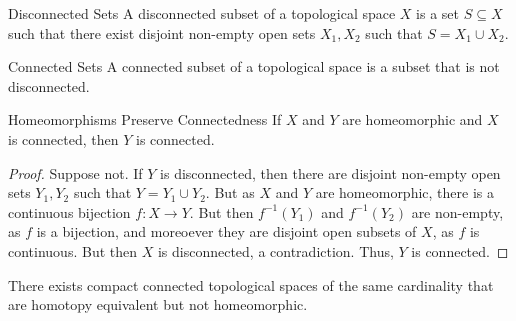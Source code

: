 \documentclass[crop=false,class=book,oneside]{standalone}                      %
\begin{document}
            \begin{ldefinition}{Disconnected Sets}
                A disconnected subset of a topological space $X$
                is a set $S\subseteq{X}$ such that there exist
                disjoint non-empty open sets $X_{1},X_{2}$ such
                that $S=X_{1}\cup{X_{2}}$.
            \end{ldefinition}
            \begin{ldefinition}{Connected Sets}
                A connected subset of a topological space
                is a subset that is not disconnected.
            \end{ldefinition}
            \begin{ltheorem}{Homeomorphisms Preserve Connectedness}
                If $X$ and $Y$ are homeomorphic and
                $X$ is connected, then $Y$ is connected.
            \end{ltheorem}
            \begin{proof}
                Suppose not. If $Y$ is disconnected, then
                there are disjoint non-empty open sets $Y_{1},Y_{2}$
                such that $Y=Y_{1}\cup{Y_{2}}$. But as $X$ and $Y$
                are homeomorphic, there is a continuous bijection
                $f:X\rightarrow{Y}$. But then
                $f^{-1}(Y_{1})$ and $f^{-1}(Y_{2})$ are
                non-empty, as $f$ is a bijection, and moreoever
                they are disjoint open subsets of $X$, as
                $f$ is continuous. But then $X$ is disconnected,
                a contradiction. Thus, $Y$ is connected.
            \end{proof}
            \begin{theorem}
                There exists compact connected topological spaces of
                the same cardinality that are homotopy equivalent but
                not homeomorphic.
            \end{theorem}
\end{document}
